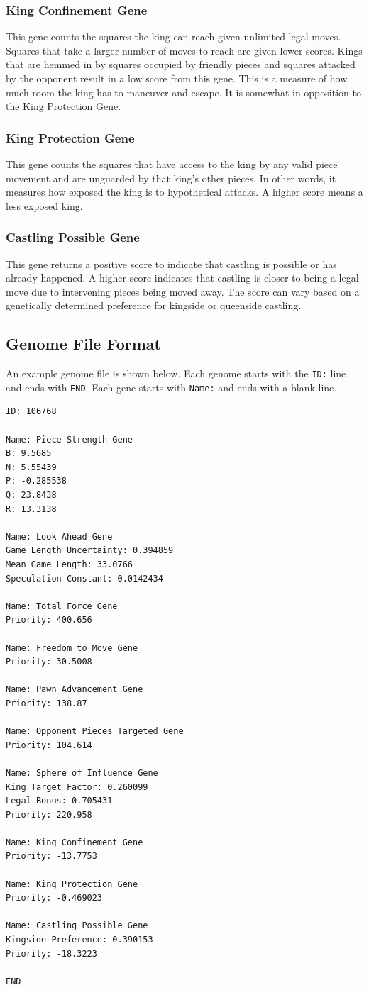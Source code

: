 \documentclass[letterpaper]{article}
\renewcommand{\_}{\allowbreak\textunderscore\allowbreak}
\begin{document}
\subsubsection{King Confinement Gene}
This gene counts the squares the king can reach given unlimited legal moves. Squares that take a larger number of moves to reach are given lower scores. Kings that are hemmed in by squares occupied by friendly pieces and squares attacked by the opponent result in a low score from this gene. This is a measure of how much room the king has to maneuver and escape. It is somewhat in opposition to the King Protection Gene.

\subsubsection{King Protection Gene}
This gene counts the squares that have access to the king by any valid piece movement and are unguarded by that king's other pieces. In other words, it measures how exposed the king is to hypothetical attacks. A higher score means a less exposed king.

\subsubsection{Castling Possible Gene}
This gene returns a positive score to indicate that castling is possible or has already happened. A higher score indicates that castling is closer to being a legal move due to intervening pieces being moved away. The score can vary based on a genetically determined preference for kingside or queenside castling.

\subsection{Genome File Format}
An example genome file is shown below. Each genome starts with the \verb|ID:| line and ends with \verb|END|. Each gene starts with \verb|Name:| and ends with a blank line.
\begin{verbatim}
ID: 106768

Name: Piece Strength Gene
B: 9.5685
N: 5.55439
P: -0.285538
Q: 23.8438
R: 13.3138

Name: Look Ahead Gene
Game Length Uncertainty: 0.394859
Mean Game Length: 33.0766
Speculation Constant: 0.0142434

Name: Total Force Gene
Priority: 400.656

Name: Freedom to Move Gene
Priority: 30.5008

Name: Pawn Advancement Gene
Priority: 138.87

Name: Opponent Pieces Targeted Gene
Priority: 104.614

Name: Sphere of Influence Gene
King Target Factor: 0.260099
Legal Bonus: 0.705431
Priority: 220.958

Name: King Confinement Gene
Priority: -13.7753

Name: King Protection Gene
Priority: -0.469023

Name: Castling Possible Gene
Kingside Preference: 0.390153
Priority: -18.3223

END
\end{verbatim}
\end{document}
